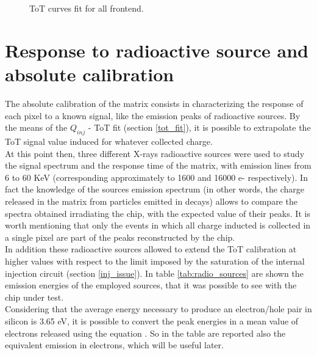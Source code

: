 \begin{figure}[h!]
\centering
{}\quad
{}\\
\quad
{}\\
\caption{ToT curves fit for all frontend.}
\label{fig:tot_fe}
\end{figure}


\section{Response to radioactive source and absolute calibration} \label{source_ana}


The absolute calibration of the matrix consists in characterizing the response of each pixel to a known signal, like the emission peaks of radioactive sources. By the means of the $Q_{inj}$ - ToT fit (section \ref{tot_fit}), it is possible to extrapolate the ToT signal value induced for whatever collected charge.\\
At this point then, three different X-rays radioactive sources were used to study the signal spectrum and the response time of the matrix, with emission lines from 6 to 60 KeV (corresponding approximately to 1600 and 16000 e- respectively).
In fact the knowledge of the sources emission spectrum (in other words, the charge released in the matrix from particles emitted in decays) allows to compare the spectra obtained irradiating the chip, with the expected value of their peaks. It is worth mentioning that only the events in which all charge inducted is collected in a single pixel are part of the peaks reconstructed by the chip.\\
In addition these radioactive sources allowed to extend the ToT calibration at higher values with respect to the limit imposed by the saturation of the internal injection circuit (section \ref{inj_issue}). In table \vref{tab:radio_sources} are shown the emission energies of the employed sources, that it was possible to see with the chip under test.\\
Considering that the average energy necessary to produce an electron/hole pair in silicon is 3.65 eV, it is possible to convert the peak energies in a mean value of electrons released using the equation . So in the table are reported also the equivalent emission in electrons, which will be useful later.

